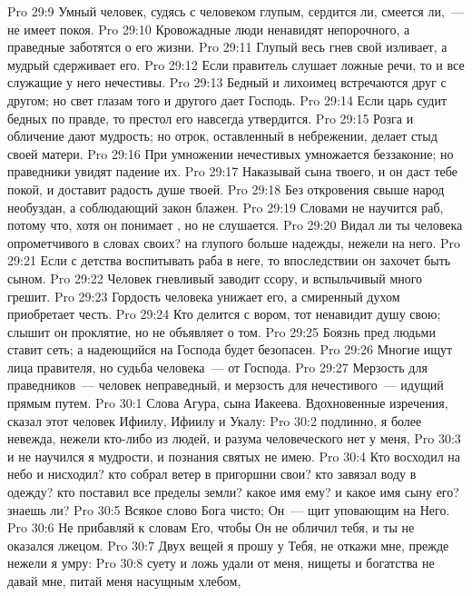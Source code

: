 \vs Pro 29:9 Умный человек, судясь с человеком глупым, сердится ли, смеется ли,~--- не имеет покоя.
\vs Pro 29:10 Кровожадные люди ненавидят непорочного, а праведные заботятся о его жизни.
\vs Pro 29:11 Глупый весь гнев свой изливает, а мудрый сдерживает его.
\vs Pro 29:12 Если правитель слушает ложные речи, то и все служащие у него нечестивы.
\vs Pro 29:13 Бедный и лихоимец встречаются друг с другом; но свет глазам того и другого дает Господь.
\vs Pro 29:14 Если царь судит бедных по правде, то престол его навсегда утвердится.
\vs Pro 29:15 Розга и обличение дают мудрость; но отрок, оставленный в небрежении, делает стыд своей матери.
\vs Pro 29:16 При умножении нечестивых умножается беззаконие; но праведники увидят падение их.
\vs Pro 29:17 Наказывай сына твоего, и он даст тебе покой, и доставит радость душе твоей.
\rsbpar\vs Pro 29:18 Без откровения свыше народ необуздан, а соблюдающий закон блажен.
\vs Pro 29:19 Словами не научится раб, потому что, хотя он понимает , но не слушается.
\vs Pro 29:20 Видал ли ты человека опрометчивого в словах своих? на глупого больше надежды, нежели на него.
\vs Pro 29:21 Если с детства воспитывать раба в неге, то впоследствии он захочет быть сыном.
\vs Pro 29:22 Человек гневливый заводит ссору, и вспыльчивый много грешит.
\vs Pro 29:23 Гордость человека унижает его, а смиренный духом приобретает честь.
\vs Pro 29:24 Кто делится с вором, тот ненавидит душу свою; слышит он проклятие, но не объявляет о том.
\vs Pro 29:25 Боязнь пред людьми ставит сеть; а надеющийся на Господа будет безопасен.
\vs Pro 29:26 Многие ищут  лица правителя, но судьба человека~--- от Господа.
\vs Pro 29:27 Мерзость для праведников~--- человек неправедный, и мерзость для нечестивого~--- идущий прямым путем.
\vs Pro 30:1 Слова Агура, сына Иакеева. Вдохновенные изречения,  сказал этот человек Ифиилу, Ифиилу и Укалу:
\vs Pro 30:2 подлинно, я более невежда, нежели кто-либо из людей, и разума человеческого нет у меня,
\vs Pro 30:3 и не научился я мудрости, и познания святых не имею.
\vs Pro 30:4 Кто восходил на небо и нисходил? кто собрал ветер в пригоршни свои? кто завязал воду в одежду? кто поставил все пределы земли? какое имя ему? и какое имя сыну его? знаешь ли?
\rsbpar\vs Pro 30:5 Всякое слово Бога чисто; Он~--- щит уповающим на Него.
\vs Pro 30:6 Не прибавляй к словам Его, чтобы Он не обличил тебя, и ты не оказался лжецом.
\rsbpar\vs Pro 30:7 Двух вещей я прошу у Тебя, не откажи мне, прежде нежели я умру:
\vs Pro 30:8 суету и ложь удали от меня, нищеты и богатства не давай мне, питай меня насущным хлебом,
